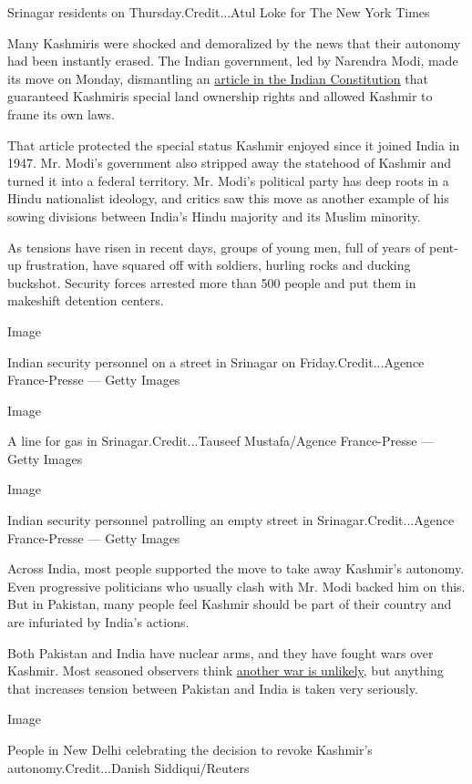 Srinagar residents on Thursday.Credit...Atul Loke for The New York Times

Many Kashmiris were shocked and demoralized by the news that their
autonomy had been instantly erased. The Indian government, led by
Narendra Modi, made its move on Monday, dismantling an
\href{https://www.nytimes.com/interactive/2019/world/asia/india-pakistan-crisis.html}{article
in the Indian Constitution} that guaranteed Kashmiris special land
ownership rights and allowed Kashmir to frame its own laws.

That article protected the special status Kashmir enjoyed since it
joined India in 1947. Mr. Modi's government also stripped away the
statehood of Kashmir and turned it into a federal territory. Mr. Modi's
political party has deep roots in a Hindu nationalist ideology, and
critics saw this move as another example of his sowing divisions between
India's Hindu majority and its Muslim minority.

As tensions have risen in recent days, groups of young men, full of
years of pent-up frustration, have squared off with soldiers, hurling
rocks and ducking buckshot. Security forces arrested more than 500
people and put them in makeshift detention centers.

Image

Indian security personnel on a street in Srinagar on
Friday.Credit...Agence France-Presse --- Getty Images

Image

A line for gas in Srinagar.Credit...Tauseef Mustafa/Agence France-Presse
--- Getty Images

Image

Indian security personnel patrolling an empty street in
Srinagar.Credit...Agence France-Presse --- Getty Images

Across India, most people supported the move to take away Kashmir's
autonomy. Even progressive politicians who usually clash with Mr. Modi
backed him on this. But in Pakistan, many people feel Kashmir should be
part of their country and are infuriated by India's actions.

Both Pakistan and India have nuclear arms, and they have fought wars
over Kashmir. Most seasoned observers think
\href{https://www.nytimes.com/2019/08/09/world/asia/kashmir-india-pakistan.html}{another
war is unlikely}, but anything that increases tension between Pakistan
and India is taken very seriously.

Image

People in New Delhi celebrating the decision to revoke Kashmir's
autonomy.Credit...Danish Siddiqui/Reuters

